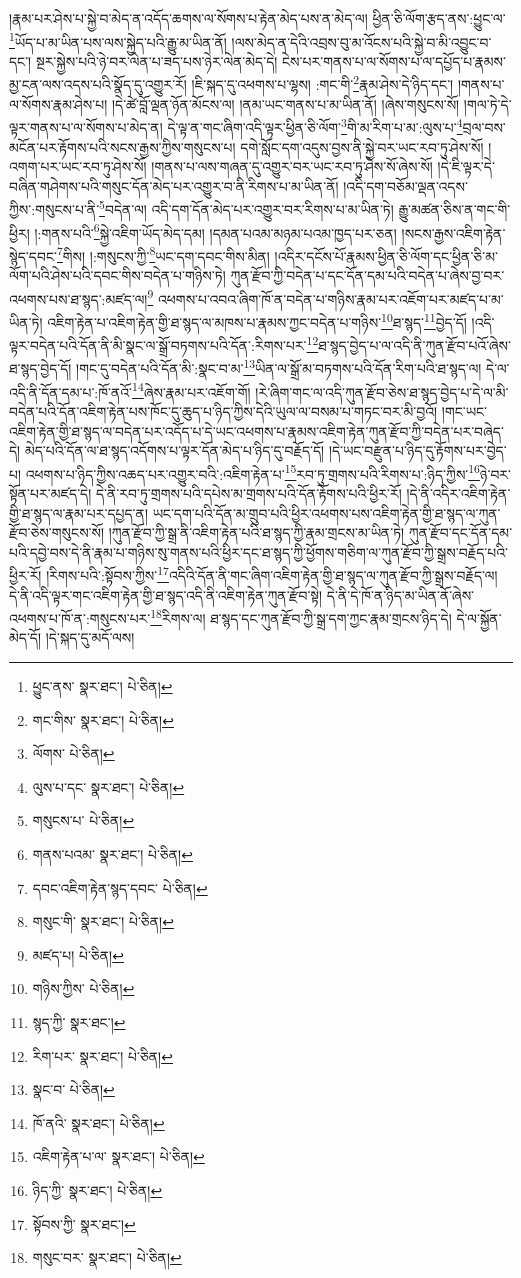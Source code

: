 །རྣམ་པར་ཤེས་པ་སྐྱེ་བ་མེད་ན་འདོད་ཆགས་ལ་སོགས་པ་རྟེན་མེད་པས་ན་མེད་ལ། ཕྱིན་ཅི་ལོག་རྩད་ནས་:ཕྱུང་ལ་\footnote{ཕྱུང་ནས་  སྣར་ཐང་།  པེ་ཅིན། }ཡོད་པ་མ་ཡིན་པས་ལས་སྐྱེད་པའི་རྒྱུ་མ་ཡིན་ནོ། །ལས་མེད་ན་དེའི་འབྲས་བུ་མ་འོངས་པའི་སྐྱེ་བ་མི་འབྱུང་བ་དང་། སྔར་སྐྱེས་པའི་ཉེ་བར་ལེན་པ་ཟད་པས་ཉེར་ལེན་མེད་དེ། ངེས་པར་གནས་པ་ལ་སོགས་པ་ལ་དཔྱོད་པ་རྣམས་མྱ་ངན་ལས་འདས་པའི་སྣོད་དུ་འགྱུར་རོ། །ཇི་སྐད་དུ་འཕགས་པ་ལྷས། :གང་གི་\footnote{གང་གིས་  སྣར་ཐང་།  པེ་ཅིན། }རྣམ་ཤེས་དེ་ཉིད་དང་། །གནས་པ་ལ་སོགས་རྣམ་ཤེས་པ། །དེ་ཚེ་བློ་ལྡན་ཉོན་མོངས་ལ། །ནམ་ཡང་གནས་པ་མ་ཡིན་ནོ། །ཞེས་གསུངས་སོ། །གལ་ཏེ་དེ་ལྟར་གནས་པ་ལ་སོགས་པ་མེད་ན། དེ་ལྟ་ན་གང་ཞིག་འདི་ལྟར་ཕྱིན་ཅི་ལོག་\footnote{ལོགས་  པེ་ཅིན། }གི་མ་རིག་པ་མ་:ལུས་པ་\footnote{ལུས་པ་དང་  སྣར་ཐང་།  པེ་ཅིན། }བྲལ་བས་མངོན་པར་རྟོགས་པའི་སངས་རྒྱས་ཀྱིས་གསུངས་པ། དགེ་སློང་དག་འདུས་བྱས་ནི་སྐྱེ་བར་ཡང་རབ་ཏུ་ཤེས་སོ། །འགག་པར་ཡང་རབ་ཏུ་ཤེས་སོ། །གནས་པ་ལས་གཞན་དུ་འགྱུར་བར་ཡང་རབ་ཏུ་ཤེས་སོ་ཞེས་སོ། །དེ་ཇི་ལྟར་དེ་བཞིན་གཤེགས་པའི་གསུང་དོན་མེད་པར་འགྱུར་བ་ནི་རིགས་པ་མ་ཡིན་ནོ། །འདི་དག་བཅོམ་ལྡན་འདས་ཀྱིས་:གསུངས་པ་ནི་\footnote{གསུངས་པ་  པེ་ཅིན། }བདེན་ལ། འདི་དག་དོན་མེད་པར་འགྱུར་བར་རིགས་པ་མ་ཡིན་ཏེ། རྒྱུ་མཚན་ཅིས་ན་གང་གི་ཕྱིར། །:གནས་པའི་\footnote{གནས་པའམ་  སྣར་ཐང་།  པེ་ཅིན། }སྐྱེ་འཇིག་ཡོད་མེད་དམ། །དམན་པའམ་མཉམ་པའམ་ཁྱད་པར་ཅན། །སངས་རྒྱས་འཇིག་རྟེན་སྙེད་དབང་\footnote{དབང་འཇིག་རྟེན་སྙད་དབང་  པེ་ཅིན། }གིས། །:གསུངས་ཀྱི་\footnote{གསུང་གི་  སྣར་ཐང་།  པེ་ཅིན། }ཡང་དག་དབང་གིས་མིན། །འདིར་དངོས་པོ་རྣམས་ཕྱིན་ཅི་ལོག་དང་ཕྱིན་ཅི་མ་ལོག་པའི་ཤེས་པའི་དབང་གིས་བདེན་པ་གཉིས་ཏེ། ཀུན་རྫོབ་ཀྱི་བདེན་པ་དང་དོན་དམ་པའི་བདེན་པ་ཞེས་བྱ་བར་འཕགས་པས་ཐ་སྙད་:མཛད་ལ།\footnote{མཛད་པ།  པེ་ཅིན། } འཕགས་པ་འབའ་ཞིག་ཁོ་ན་བདེན་པ་གཉིས་རྣམ་པར་འཇོག་པར་མཛད་པ་མ་ཡིན་ཏེ། འཇིག་རྟེན་པ་འཇིག་རྟེན་གྱི་ཐ་སྙད་ལ་མཁས་པ་རྣམས་ཀྱང་བདེན་པ་གཉིས་\footnote{གཉིས་ཀྱིས་  པེ་ཅིན། }ཐ་སྙད་\footnote{སྙད་ཀྱི་  སྣར་ཐང་། }བྱེད་དོ། །འདི་ལྟར་བདེན་པའི་དོན་ནི་མི་སྣང་ལ་སྒྲོ་བཏགས་པའི་དོན་:རིགས་པར་\footnote{རིག་པར་  སྣར་ཐང་།  པེ་ཅིན། }ཐ་སྙད་བྱེད་པ་ལ་འདི་ནི་ཀུན་རྫོབ་པའོ་ཞེས་ཐ་སྙད་བྱེད་དོ། །གང་དུ་བདེན་པའི་དོན་མི་:སྣང་བ་མ་\footnote{སྣང་བ་  པེ་ཅིན། }ཡིན་ལ་སྒྲོ་མ་བཏགས་པའི་དོན་རིག་པའི་ཐ་སྙད་ལ། དེ་ལ་འདི་ནི་དོན་དམ་པ་:ཁོ་ནའོ་\footnote{ཁོ་ནའི་  སྣར་ཐང་།  པེ་ཅིན། }ཞེས་རྣམ་པར་འཇོག་གོ། །རེ་ཞིག་གང་ལ་འདི་ཀུན་རྫོབ་ཅེས་ཐ་སྙད་བྱེད་པ་དེ་ལ་མི་བདེན་པའི་དོན་འཇིག་རྟེན་པས་ཁོང་དུ་ཆུད་པ་ཉིད་ཀྱིས་དེའི་ཡུལ་ལ་བསམ་པ་གཏང་བར་མི་བྱའོ། །གང་ཡང་འཇིག་རྟེན་གྱི་ཐ་སྙད་ལ་བདེན་པར་འདོད་པ་དེ་ཡང་འཕགས་པ་རྣམས་འཇིག་རྟེན་ཀུན་རྫོབ་ཀྱི་བདེན་པར་བཞེད་དེ། མེད་པའི་དོན་ལ་ཐ་སྙད་འདོགས་པ་ལྟར་དོན་མེད་པ་ཉིད་དུ་བརྗོད་དོ། །དེ་ཡང་བརྫུན་པ་ཉིད་དུ་རྟོགས་པར་བྱེད་པ། འཕགས་པ་ཉིད་ཀྱིས་འཆད་པར་འགྱུར་བའི་:འཇིག་རྟེན་པ་\footnote{འཇིག་རྟེན་པ་ལ་  སྣར་ཐང་།  པེ་ཅིན། }རབ་ཏུ་གྲགས་པའི་རིགས་པ་:ཉིད་ཀྱིས་\footnote{ཉིད་ཀྱི་  སྣར་ཐང་།  པེ་ཅིན། }ཉེ་བར་སྟོན་པར་མཛད་དེ། དེ་ནི་རབ་ཏུ་གྲགས་པའི་དཔེས་མ་གྲགས་པའི་དོན་རྟོགས་པའི་ཕྱིར་རོ། །དེ་ནི་འདིར་འཇིག་རྟེན་གྱི་ཐ་སྙད་ལ་རྣམ་པར་དཔྱད་ན། ཡང་དག་པའི་དོན་མ་གྲུབ་པའི་ཕྱིར་འཕགས་པས་འཇིག་རྟེན་གྱི་ཐ་སྙད་ལ་ཀུན་རྫོབ་ཅེས་གསུངས་སོ། །ཀུན་རྫོབ་ཀྱི་སྒྲ་ནི་འཇིག་རྟེན་པའི་ཐ་སྙད་ཀྱི་རྣམ་གྲངས་མ་ཡིན་ཏེ། ཀུན་རྫོབ་དང་དོན་དམ་པའི་དབྱེ་བས་དེ་ནི་རྣམ་པ་གཉིས་སུ་གནས་པའི་ཕྱིར་དང་ཐ་སྙད་ཀྱི་ཕྱོགས་གཅིག་ལ་ཀུན་རྫོབ་ཀྱི་སྒྲས་བརྗོད་པའི་ཕྱིར་རོ། །རིགས་པའི་:སྟོབས་ཀྱིས་\footnote{སྟོབས་ཀྱི་  སྣར་ཐང་། }འདིའི་དོན་ནི་གང་ཞིག་འཇིག་རྟེན་གྱི་ཐ་སྙད་ལ་ཀུན་རྫོབ་ཀྱི་སྒྲས་བརྗོད་ལ། དེ་ནི་འདི་ལྟར་གང་འཇིག་རྟེན་གྱི་ཐ་སྙད་འདི་ནི་འཇིག་རྟེན་ཀུན་རྫོབ་སྟེ། དེ་ནི་དེ་ཁོ་ན་ཉིད་མ་ཡིན་ནོ་ཞེས་འཕགས་པ་ཁོ་ན་:གསུངས་པར་\footnote{གསུང་བར་  སྣར་ཐང་།  པེ་ཅིན། }རིགས་ལ། ཐ་སྙད་དང་ཀུན་རྫོབ་ཀྱི་སྒྲ་དག་ཀྱང་རྣམ་གྲངས་ཉིད་དེ། དེ་ལ་སྐྱོན་མེད་དོ། །དེ་སྐད་དུ་མདོ་ལས། 